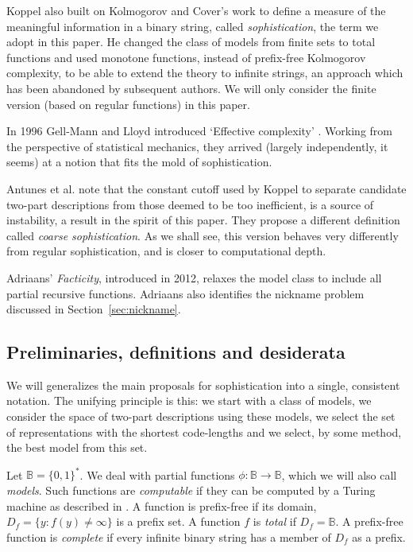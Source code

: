 \documentclass{style/llncs}
\newcommand{\B}{\mathbb B}
\begin{document}
Koppel \cite{koppelSoph1988,koppel1991almost} also built on Kolmogorov and Cover's work to define a measure of the meaningful information in a binary string, called \emph{sophistication}, the term we adopt in this paper. He changed the class of models from finite sets to total functions and used monotone functions, instead of prefix-free Kolmogorov complexity, to be able to extend the theory to infinite strings, an approach which has been abandoned by subsequent authors. We will only consider the finite version (based on regular functions) in this paper.

In 1996 Gell-Mann and Lloyd introduced `Effective complexity' \cite{gellmann1996information}. Working from the perspective of statistical mechanics, they arrived (largely independently, it seems) at a notion that fits the mold of sophistication.

Antunes et al. \cite{antunes2009sophistication} note that the constant cutoff used by Koppel to separate candidate two-part descriptions from those deemed to be too inefficient, is a source of instability, a result in the spirit of this paper. They propose a different definition called \emph{coarse sophistication}. As we shall see, this version behaves very differently from regular sophistication, and is closer to computational depth.
 
Adriaans' \emph{Facticity}, introduced in 2012\cite{adriaans2012facticity}, relaxes the model class to include all partial recursive functions. Adriaans also identifies the nickname problem discussed in Section~\ref{sec:nickname}.

\subsection{Preliminaries, definitions and desiderata}

We will generalizes the main proposals for sophistication into a single, consistent notation. The unifying principle is this: we start with a class of models, we consider the space of two-part descriptions using these models, we select the set of representations with the shortest code-lengths and we select, by some method, the best model from this set. 

Let $\B = \{0,1\}^*$. We deal with partial functions $\phi: \B \to \B$, which we will also call \emph{models}. Such functions are \emph{computable} if they can be computed by a Turing machine as described in \cite[Definition~1.7.1]{li1993introduction}. A function is prefix-free if its domain, $D_f = \{y : f(y) \neq \infty\}$ is a prefix set. A function $f$ is \emph{total} if $D_f = \B$. A prefix-free function is \emph{complete} if every infinite binary string has a member of $D_f$ as a prefix. \footnotemark 
\end{document}
